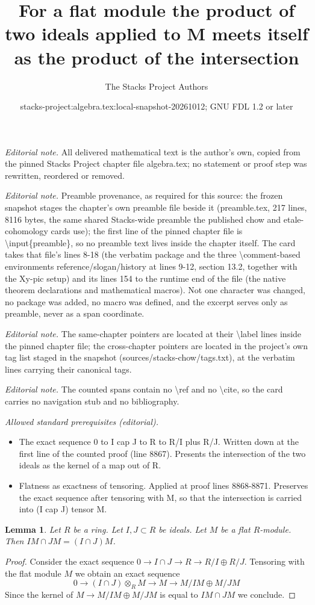 \documentclass[10pt,a4paper]{amsart}
\title{For a flat module the product of two ideals applied to M meets itself as the product of the intersection}
\author{The Stacks Project Authors}
\date{stacks-project:algebra.tex:local-snapshot-20261012; GNU FDL 1.2 or later}
\theoremstyle{plain}
\newtheorem{lemma}[subsection]{Lemma}
\theoremstyle{definition}
\theoremstyle{remark}
\numberwithin{equation}{subsection}
\begin{document}
\maketitle
\noindent\textit{Editorial note.} All delivered mathematical text is the author's own, copied from the pinned Stacks Project chapter file algebra.tex; no statement or proof step was rewritten, reordered or removed.\par\medskip
\noindent\textit{Editorial note.} Preamble provenance, as required for this source: the frozen snapshot stages the chapter's own preamble file beside it (preamble.tex, 217 lines, 8116 bytes, the same shared Stacks-wide preamble the published chow and etale-cohomology cards use); the first line of the pinned chapter file is \textbackslash{}input\{preamble\}, so no preamble text lives inside the chapter itself. The card takes that file's lines 8-18 (the verbatim package and the three \textbackslash{}comment-based environments reference/slogan/history at lines 9-12, section 13.2, together with the Xy-pic setup) and its lines 154 to the runtime end of the file (the native theorem declarations and mathematical macros). Not one character was changed, no package was added, no macro was defined, and the excerpt serves only as preamble, never as a span coordinate.\par\medskip
\noindent\textit{Editorial note.} The same-chapter pointers are located at their \textbackslash{}label lines inside the pinned chapter file; the cross-chapter pointers are located in the project's own tag list staged in the snapshot (sources/stacks-chow/tags.txt), at the verbatim lines carrying their canonical tags.\par\medskip
\noindent\textit{Editorial note.} The counted spans contain no \textbackslash{}ref and no \textbackslash{}cite, so the card carries no navigation stub and no bibliography.\par\medskip
\noindent\textit{Allowed standard prerequisites (editorial).}\begin{itemize}
\item The exact sequence 0 to I cap J to R to R/I plus R/J. Written down at the first line of the counted proof (line 8867). Presents the intersection of the two ideals as the kernel of a map out of R.
\item Flatness as exactness of tensoring. Applied at proof lines 8868-8871. Preserves the exact sequence after tensoring with M, so that the intersection is carried into (I cap J) tensor M.
\end{itemize}\medskip
\begin{lemma}
\label{lemma-flat-intersect-ideals}
Let $R$ be a ring. Let $I, J \subset R$ be ideals. Let $M$ be a flat
$R$-module. Then $IM \cap JM = (I \cap J)M$.
\end{lemma}

\begin{proof}
Consider the exact sequence $0 \to I \cap J \to R \to R/I \oplus R/J$.
Tensoring with the flat module $M$ we obtain an exact sequence
$$
0 \to (I \cap J) \otimes_R M \to M \to M/IM \oplus M/JM
$$
Since the kernel of $M \to M/IM \oplus M/JM$ is equal to
$IM \cap JM$ we conclude.
\end{proof}
\end{document}
